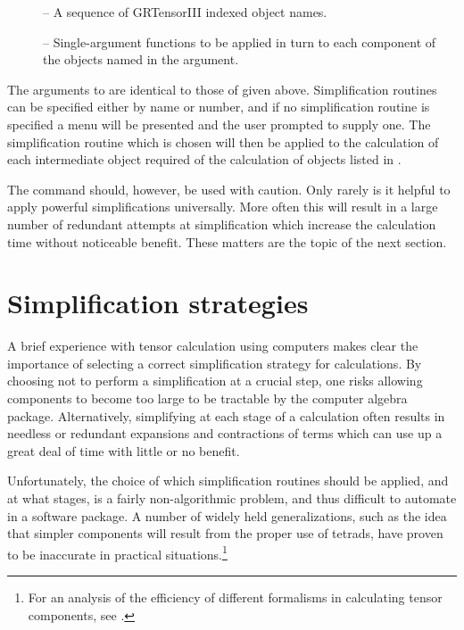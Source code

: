 \documentclass{article}
\begin{document}
{{{\begin{cmdspec}
  \begin{description}
    \item[] -- A sequence of GRTensorIII indexed object names.
    \item[] -- Single-argument functions to be applied in
      turn to each component of the objects named in the 
      argument.
  \end{description}

\end{cmdspec}

The arguments to  are identical to those of 
given above. Simplification routines can be specified either by name or
number, and if no simplification routine is specified a menu will be presented
and the user prompted to supply one. The simplification routine which is
chosen will then be applied to the calculation of each intermediate object
required of the calculation of objects listed in .

The  command should, however, be used with caution. Only
rarely is it helpful to apply powerful simplifications universally. More
often this will result in a large number of redundant attempts at
simplification which increase the calculation time without noticeable
benefit.
These matters are the topic of the next section.
%
\section{Simplification strategies} \label{sec:simplification}
%
A brief experience with tensor calculation using computers makes clear
the importance of selecting a correct simplification strategy for
calculations. By choosing not to perform a simplification at a crucial
step, one risks allowing components to become too large to be
tractable by the computer algebra package. Alternatively, simplifying
at each stage of a calculation often results in needless or redundant
expansions and contractions of terms which can use up a great deal of
time with little or no benefit.

Unfortunately, the choice of which simplification routines should be
applied, and at what stages, is a fairly non-algorithmic problem, and
thus difficult to automate in a software package. A number of widely
held generalizations, such as the idea that simpler components will
result from the proper use of tetrads, have proven to be inaccurate in
practical situations.\footnote{For an analysis of the efficiency of
different formalisms in calculating tensor components, see
\cite{pmsl96}.}

}}}
\end{document}
